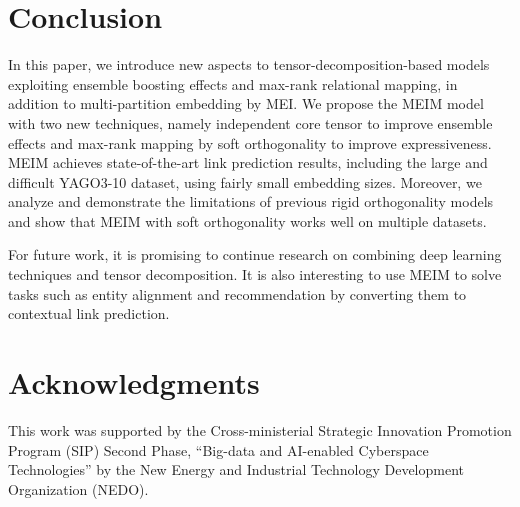 \documentclass{article}
\theoremstyle{plain}
\theoremstyle{remark}
\begin{document}
\section{Conclusion} \label{sect:conclusion} In this paper, we introduce new aspects to tensor-decomposition-based models exploiting ensemble boosting effects and max-rank relational mapping, in addition to multi-partition embedding by MEI. We propose the MEIM model with two new techniques, namely independent core tensor to improve ensemble effects and max-rank mapping by soft orthogonality to improve expressiveness. MEIM achieves state-of-the-art link prediction results, including the large and difficult YAGO3-10 dataset, using fairly small embedding sizes. Moreover, we analyze and demonstrate the limitations of previous rigid orthogonality models and show that MEIM with soft orthogonality works well on multiple datasets. 

For future work, it is promising to continue research on combining deep learning techniques and tensor decomposition. It is also interesting to use MEIM to solve tasks such as entity alignment and recommendation by converting them to contextual link prediction.


\section*{Acknowledgments}
This work was supported by the Cross-ministerial Strategic Innovation Promotion Program (SIP) Second Phase, ``Big-data and AI-enabled Cyberspace Technologies'' by the New Energy and Industrial Technology Development Organization (NEDO).
\end{document}
